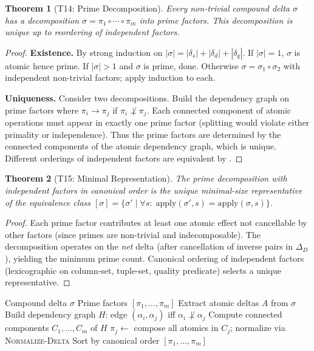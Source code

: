 \documentclass[11pt,a4paper]{article}
\newtheorem{theorem}{Theorem}[section]
\theoremstyle{definition}
\newcommand{\DeltaD}{\Delta_{\!D}}
\begin{document}
\begin{theorem}[T14: Prime Decomposition]\label{thm:prime-decomp}
Every non-trivial compound delta $\sigma$ has a decomposition
$\sigma = \pi_1 \circ \cdots \circ \pi_m$ into prime factors.
This decomposition is unique up to reordering of independent factors.
\end{theorem}

\begin{proof}
\textbf{Existence.}
By strong induction on $|\sigma| = |\delta_s| + |\delta_d| + |\delta_q|$.
If $|\sigma| = 1$, $\sigma$ is atomic hence prime.  If $|\sigma| > 1$ and
$\sigma$ is prime, done.  Otherwise $\sigma = \sigma_1 \circ \sigma_2$ with
independent non-trivial factors; apply induction to each.

\textbf{Uniqueness.}
Consider two decompositions.  Build the dependency graph on prime factors
where $\pi_i \to \pi_j$ if $\pi_i \not\perp \pi_j$.  Each connected component
of atomic operations must appear in exactly one prime factor (splitting would
violate either primality or independence).  Thus the prime factors are determined
by the connected components of the atomic dependency graph, which is unique.
Different orderings of independent factors are equivalent by .
\end{proof}

\begin{theorem}[T15: Minimal Representation]\label{thm:minimal-repr}
The prime decomposition with independent factors in canonical order is the
unique minimal-size representative of the equivalence class
$[\sigma] = \{\sigma' \mid \forall s:\; \mathrm{apply}(\sigma', s) =
\mathrm{apply}(\sigma, s)\}$.
\end{theorem}

\begin{proof}
Each prime factor contributes at least one atomic effect not cancellable by
other factors (since primes are non-trivial and indecomposable).
The decomposition operates on the \emph{net} delta (after cancellation of
inverse pairs in $\DeltaD$), yielding the minimum prime count.  Canonical
ordering of independent factors (lexicographic on column-set, tuple-set, quality
predicate) selects a unique representative.
\end{proof}

\begin{algorithm}[htbp]
\caption{\textsc{Decompose-Delta}: Prime Factorization}
\label{alg:decompose-delta}
\begin{algorithmic}[1]
\Require Compound delta $\sigma$
\Ensure Prime factors $[\pi_1, \ldots, \pi_m]$
\State Extract atomic deltas $A$ from $\sigma$
\State Build dependency graph $H$: edge $(\alpha_i, \alpha_j)$ iff $\alpha_i \not\perp \alpha_j$
\State Compute connected components $C_1, \ldots, C_m$ of $H$
  \State $\pi_j \gets$ compose all atomics in $C_j$; normalize via \textsc{Normalize-Delta}
\EndFor
\State Sort by canonical order
\State \Return $[\pi_1, \ldots, \pi_m]$
\end{algorithmic}
\end{algorithm}
\end{document}
